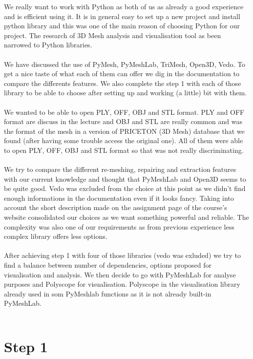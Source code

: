 \documentclass[10pt,twocolumn,letterpaper]{article}
\begin{document}
We really want to work with Python as both of us as already a good experience and is efficient using it. It is in general easy to set up a new project and install python library and this was one of the main reason of choosing Python for our project. The research of 3D Mesh analysis and visualisation tool as been narrowed to Python libraries. \\ \\
We have discussed the use of PyMesh, PyMeshLab, TriMesh, Open3D, Vedo. To get a nice taste of what each of them can offer we dig in the documentation to compare the differents features. We also complete the step 1 with each of those library to be able to choose after setting up and working (a little) bit with them. \\ \\
	We wanted to be able to open PLY, OFF, OBJ and STL format. PLY and OFF format are discuss in the lecture and OBJ and STL are really common and was the format of the mesh in a version of PRICETON (3D Mesh) database that we found (after having some trouble access the original one). All of them were able to open PLY, OFF, OBJ and STL format so that was not really discriminating. \\ \\
	We try to compare the different re-meshing, repairing and extraction features with our current knowledge and thought that PyMeshLab and Open3D seems to be quite good. Vedo was excluded from the choice at this point as we didn't find enough informations in the documentation even if it looks fancy. Taking into account the short description made on the assignment page of the course's website consolidated our choices as we want something powerful and reliable. The complexity was also one of our requirements as from previous experience less complex library offers less options. \\ \\
	After achieving step 1 with four of those libraries (vedo was exluded) we try to find a balance between number of dependencies, options proposed for visualisation and analysis. We then decide to go with PyMeshLab\cite{pymeshlab} for analyse purposes and Polyscope\cite{polyscope} for visualisation. Polyscope in the visualisation library already used in som PyMeshlab functions as it is not already built-in PyMeshLab. \\ \\
	
\section{Step 1}
\end{document}
